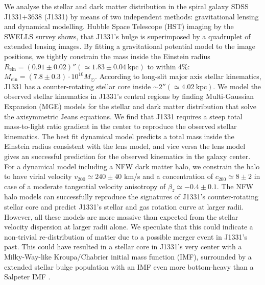 We analyse the stellar and dark matter distribution in the spiral galaxy SDSS J1331+3638 (J1331) by means of two independent methods: gravitational lensing and dynamical modelling. Hubble Space Telescope (HST) imaging by the SWELLS survey shows, that J1331's bulge is superimposed by a quadruplet of extended lensing images. By fitting a gravitational potential model to the image positions, we tightly constrain the mass inside the Einstein radius $R_\text{ein}=(0.91\pm0.02)''(\simeq1.83\pm0.04~\text{kpc})$ to within 4\%: $M_\text{ein} = (7.8\pm0.3) \cdot 10^{10} M_\odot$. According to long-slit major axis stellar kinematics, J1331 has a counter-rotating stellar core inside $\sim 2''(\simeq4.02~\text{kpc})$. We model the observed stellar kinematics in J1331's central regions by finding Multi-Gaussian Expansion (MGE) models for the stellar and dark matter distribution that solve the axisymmetric Jeans equations. We find that J1331 requires a steep total mass-to-light ratio gradient in the center to reproduce the observed stellar kinematics. The best fit dynamical model predicts a total mass inside the Einstein radius consistent with the lens model, and vice versa the lens model gives an successful prediction for the observed kinematics in the galaxy center. For a dynamical model including a NFW dark matter halo,  we constrain the halo to have virial velocity $v_{200} \simeq 240 \pm 40$ km/s and a concentration of $c_{200} \simeq 8 \pm 2$ in case of a moderate tangential velocity anisotropy of $\beta_z \simeq -0.4 \pm 0.1$. The NFW halo models can successfully reproduce the signatures of J1331's counter-rotating stellar core and predict J1331's stellar and gas rotation curve at larger radii. However, all these models are more massive than expected from the stellar velocity dispersion at larger radii alone. We speculate that this could indicate a non-trivial re-distribution of matter due to a possible merger event in J1331's past. This could have resulted in a stellar core in J1331's very center with a Milky-Way-like Kroupa/Chabrier initial mass function (IMF), surrounded by a extended stellar bulge population with an IMF even more bottom-heavy than a Salpeter IMF .